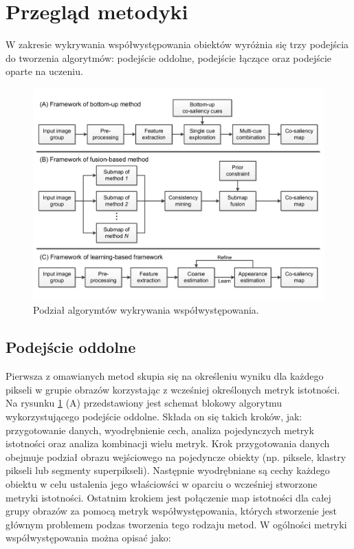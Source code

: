 \documentclass[a4paper,11pt, notitlepage, twosides, openany ]{report}
\begin{document}
	\section{Przegląd metodyki}
	W zakresie wykrywania współwystępowania obiektów wyróżnia się trzy podejścia do tworzenia algorytmów: podejście oddolne, podejście łączące oraz podejście oparte na uczeniu.

	\begin{figure}[h]
		\centering
		\includegraphics[width=1\textwidth]{cosal_met.png}
		\caption{Podział algorymtów wykrywania współwystępowania.}
		\label{pod}
	\end{figure}

	\subsection{Podejście oddolne}
	Pierwsza z omawianych metod skupia się na określeniu wyniku dla każdego pikseli w grupie obrazów korzystając z wcześniej określonych metryk istotności. Na rysunku \ref{pod} (A) przedstawiony jest schemat blokowy algorytmu wykorzystującego podejście oddolne. Składa on się takich kroków, jak: przygotowanie danych, wyodrębnienie cech, analiza pojedynczych metryk istotności oraz analiza kombinacji wielu metryk. Krok przygotowania danych obejmuje podział obrazu wejściowego na pojedyncze obiekty (np. piksele, klastry pikseli lub segmenty superpikseli). Następnie wyodrębniane są cechy każdego obiektu w celu ustalenia jego właściowści w oparciu o wcześniej stworzone metryki istotności. Ostatnim krokiem jest połączenie map istotności dla całej grupy obrazów za pomocą metryk współwystępowania, których stworzenie jest głównym problemem podzas tworzenia tego rodzaju metod. W ogólności metryki współwystępowania można opisać jako:
\end{document}
